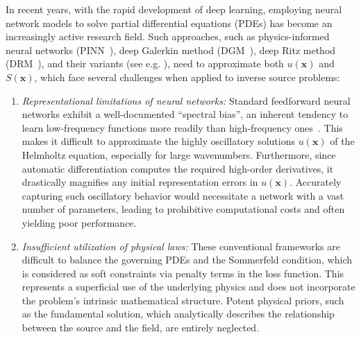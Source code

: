 \documentclass{article}
\theoremstyle{plain}
\theoremstyle{definition}
\begin{document}
In recent years, with the rapid development of deep learning, employing neural network models to solve partial differential equations (PDEs) has become an increasingly active research field. Such approaches, such as physics-informed neural networks (PINN~\cite{raissi2019physics}), deep Galerkin method (DGM~\cite{sirignano2018dgm}), deep Ritz method (DRM~\cite{ew2018ritz}), and their variants (see e.g. \cite{jagtap2020extended,kharazmi2021hp, LiaoMing2021DeepNitsche, YuZhang2025NaturalDeep}), need to approximate both $u(\boldsymbol{x})$ and $S(\boldsymbol{x})$, which
face several challenges when applied to inverse source problems: 
\begin{enumerate}
\item \emph{Representational limitations of neural networks:} Standard feedforward neural networks \cite{sheng2024MC-fPINNs} exhibit a well-documented ``spectral bias'', an inherent tendency to learn low-frequency functions more readily than high-frequency ones~\cite{rahaman2019spectral, xu2019frequency}. This makes it difficult to approximate the highly oscillatory solutions $u(\boldsymbol{x})$ of the Helmholtz equation, especially for large wavenumbers. Furthermore, since automatic differentiation computes the required high-order derivatives, it drastically magnifies any initial representation errors in $u(\boldsymbol{x})$. Accurately capturing such oscillatory behavior would necessitate a network with a vast number of parameters, leading to prohibitive computational costs and often yielding poor performance. 
 
\item \emph{Insufficient utilization of physical laws:} These conventional frameworks are difficult to balance the governing PDEs and the Sommerfeld condition, which is considered as soft constraints via penalty terms in the loss function. This represents a superficial use of the underlying physics and does not incorporate the problem's intrinsic mathematical structure. Potent physical priors, such as the fundamental solution, which analytically describes the relationship between the source and the field, are entirely neglected.
\end{enumerate}
\end{document}

